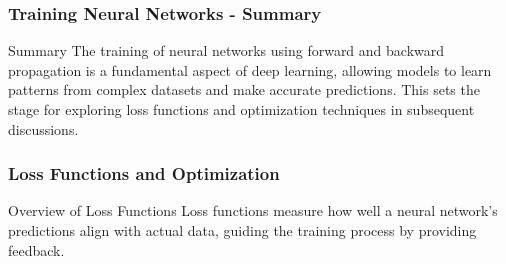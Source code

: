 \documentclass[aspectratio=169]{beamer}
\begin{document}
\begin{frame}[fragile]
    \frametitle{Training Neural Networks - Summary}
    \begin{block}{Summary}
        The training of neural networks using forward and backward propagation is a fundamental aspect of deep learning, allowing models to learn patterns from complex datasets and make accurate predictions. This sets the stage for exploring loss functions and optimization techniques in subsequent discussions.
    \end{block}
\end{frame}

\begin{frame}
    \frametitle{Loss Functions and Optimization}
    \begin{block}{Overview of Loss Functions}
        Loss functions measure how well a neural network's predictions align with actual data, guiding the training process by providing feedback.
    \end{block}
\end{frame}
\end{document}
